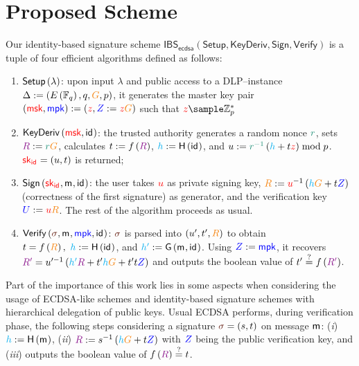 \documentclass[version=submission, floatrow]{iacrcc}
\begin{document}
\section{Proposed Scheme}\label{sec:ecdsa-ibs}
\begin{definition}\label{def:ecdsa-ibs}
    Our identity-based signature scheme $\mathsf{IBS}_{\mathsf{ecdsa}}  \left(\mathsf{Setup}, \mathsf{KeyDeriv}, \mathsf{Sign}, \mathsf{Verify}\right)$ is a tuple of four efficient algorithms defined as follows:
    \begin{enumerate}[label={\emph{\roman*})}]
        \item $\mathsf{Setup}\left(\lambda\right)$: upon input $\lambda$ and public access to a DLP--instance $\Delta := \left(\EllipticCurve, q, \GeneratorEC, p\right)$, it generates the master key pair $\left(\msk, \mpk\right) := \left(\PrivKey{z}, \PubKey{Z} := \PrivKey{z}\GeneratorEC\right)$ such that $\PrivKey{z} \sample \Zpplus$

        \item $\mathsf{KeyDeriv}\left(\textcolor{red}{\mathsf{msk}}, \mathsf{id}_{}\right)$: the trusted authority generates a random nonce $\Nonce{r}$, sets $\Commitment{R} := \Nonce{r}\GeneratorEC$, calculates $t := \ProjFunction{\Commitment{R}}$, $\textcolor{cyan}{h} := \mathsf{H}\left(\mathsf{id}_{}\right)$, and $u := \Nonce{r^{-1}}\left(\Digest{h} +t\PrivKey{z}\right)\bmod{p}$. $\textcolor{red}{\mathsf{sk}_{\mathsf{id}_{}}} = \left(u, t\right)$ is returned;
        
        \item $\mathsf{Sign}\left(\textcolor{red}{\mathsf{sk}_{\mathsf{id}_{}}}, \mathsf{m}_{}, \mathsf{id}_{}\right)$: the user takes $\textcolor{red}{u}$ as private signing key, $\Generator{R} := \PrivKey{u}^{-1}\left(\Digest{h}\GeneratorEC + t\PubKey{Z}\right)$  (correctness of the first signature) as generator, and the verification key $\PubKey{U} := \PrivKey{u}\Generator{R}$. The rest of the algorithm proceeds as usual.

        \item $\Verify{\Signature{}, \msg{}, \mpk, \id{}}$: $\Signature{}$ is parsed into $\left(u', t', \Generator{R}\right)$ to obtain $t = \ProjFunction{\Generator{R}},\ \Digest{h} := \HashH{\id{}}$, and $\textcolor{cyan}{h'} := \mathsf{G}\left(\mathsf{m}_{}, \mathsf{id}_{}\right)$. Using $\textcolor{blue}{Z} := \textcolor{blue}{\mathsf{mpk}}$,
        it recovers $\Commitment{R'} = u'^{-1}\left(\Digest{h'}\Commitment{R} + t'\Digest{h}\GeneratorEC + t't\PubKey{Z}\right)$ and outputs the boolean value of $t' \overset{?}{=} \ProjFunction{\Commitment{R'}}$.
    \end{enumerate}
\end{definition}

Part of the importance of this work lies in some aspects when considering the usage of ECDSA-like schemes and identity-based signature schemes with hierarchical delegation of public keys. 
%
Usual ECDSA performs, during verification phase, the following steps considering a signature $\Signature{} = \left(s, t\right)$ on message $\mathsf{m}_{}$: (\textit{i}) $\textcolor{cyan}{h} := \mathsf{H}\left(\mathsf{m}_{}\right)$, (\textit{ii}) $\Commitment{R} := s^{-1}\left(\Digest{h}\GeneratorEC + t\PubKey{Z}\right)$ with $\textcolor{blue}{Z}$ being the public verification key, and (\textit{iii}) outputs the boolean value of $\ProjFunction{\Commitment{R}} \overset{?}{=} t$. 
%
\end{document}
